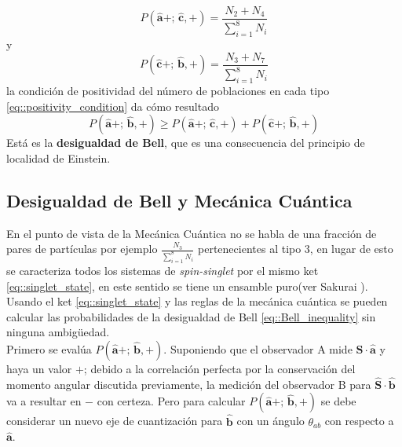 \documentclass[a4paper]{article}
\begin{document}
\begin{equation}
P(\mathbf{\hat{a}}+;\, \mathbf{\hat{c}},+) = \frac{N_2+N_4}{\sum_{i=1}^{8} N_i} 
\end{equation}
y
\begin{equation}
P(\mathbf{\hat{c}}+;\, \mathbf{\hat{b}},+) = \frac{N_3+N_7}{\sum_{i=1}^{8} N_i} 
\end{equation}
la condición de positividad del número de poblaciones en cada tipo \ref{eq::positivity_condition} da cómo resultado
\begin{equation}\label{eq::Bell_inequality}
P(\mathbf{\hat{a}}+;\, \mathbf{\hat{b}},+) \geq P(\mathbf{\hat{a}}+;\, \mathbf{\hat{c}},+) + P(\mathbf{\hat{c}}+;\, \mathbf{\hat{b}},+)  
\end{equation}
Está es la \textbf{desigualdad de Bell}, que es una consecuencia del principio de localidad de Einstein.

\subsection{Desigualdad de Bell y Mecánica Cuántica}
En el punto de vista de la Mecánica Cuántica no se habla de una fracción de pares de partículas por ejemplo $\frac{N_3}{\sum_{i=1}^{8} N_i}$ pertenecientes al tipo 3, en lugar de esto se caracteriza todos los sistemas de \textit{spin-singlet} por el mismo ket \ref{eq::singlet_state}, en este sentido se tiene un ensamble puro(ver Sakurai \cite{Sakurai}). Usando el ket \ref{eq::singlet_state} y las reglas de la mecánica cuántica se pueden calcular las probabilidades de la desigualdad de Bell \ref{eq::Bell_inequality} sin ninguna ambigüedad.\\

Primero se evalúa $P(\mathbf{\hat{a}}+;\, \mathbf{\hat{b}},+)$. Suponiendo que el observador A mide $\mathbf{\hat{S}} \cdot \mathbf{\hat{a}}$ y haya un valor $+$; debido a la correlación perfecta por la conservación del momento angular discutida previamente, la medición del observador B para $\mathbf{\hat{S}} \cdot \mathbf{\hat{b}}$ va a resultar en $-$ con certeza. Pero para calcular $P(\mathbf{\hat{a}}+;\, \mathbf{\hat{b}},+)$ se debe considerar un nuevo eje de cuantización para $\mathbf{\hat{b}}$ con un ángulo $\theta_{ab}$ con respecto a $\mathbf{\hat{a}}$.
\end{document}
